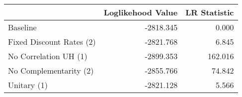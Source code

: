 \begin{tabular}{lrr}
\toprule
{} & Loglikehood Value & LR Statistic \\
\midrule
Baseline                 &         -2818.345 &        0.000 \\
Fixed Discount Rates (2) &         -2821.768 &        6.845 \\
No Correlation UH (1)    &         -2899.353 &      162.016 \\
No Complementarity (2)   &         -2855.766 &       74.842 \\
Unitary (1)              &         -2821.128 &        5.566 \\
\bottomrule
\end{tabular}
